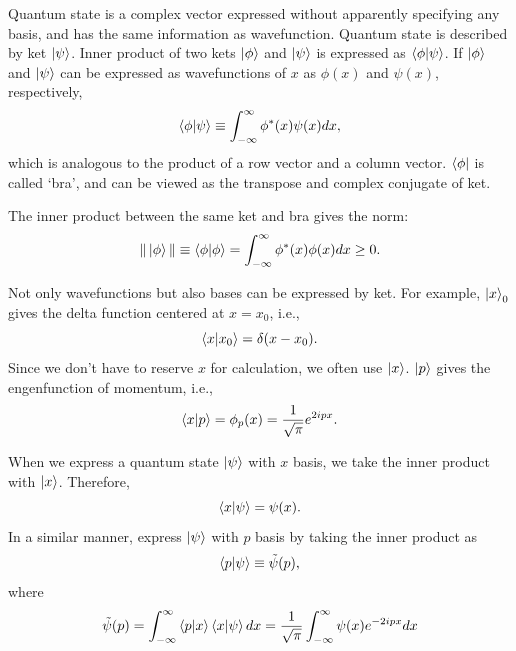 \documentclass{book}
\begin{document}
Quantum state is a complex vector expressed without apparently specifying any basis, and has the same information as wavefunction. Quantum state is described by ket $\ket \psi$. Inner product of two kets $\ket \phi$ and $\ket \psi$ is expressed as $\braket{\phi|\psi}$. If $\ket \phi$ and $\ket \psi$ can be expressed as wavefunctions of $x$ as $\phi(x)$ and $\psi(x)$, respectively, 
\begin{equation}
  \braket{\phi|\psi} \equiv \int_{-\infty}^{\infty}\phi^*(x)\psi(x)dx,
\end{equation}
which is analogous to the product of a row vector and a column vector. $\bra \phi$ is called `bra', and can be viewed as the transpose and complex conjugate of ket.

The inner product between the same ket and bra gives the norm:
\begin{equation}
  \|\ket \phi\| \equiv \braket{\phi|\phi} = \int_{-\infty}^{\infty}\phi^*(x)\phi(x)dx \geq 0.
\end{equation}



Not only wavefunctions but also bases can be expressed by ket. For example, $\ket x_0$ gives the delta function centered at $x = x_0$, i.e.,
\begin{equation}
  \braket{x|x_0} = \delta(x-x_0).
\end{equation}
Since we don't have to reserve $x$ for calculation, we often use $\ket x$. $\ket p$ gives the engenfunction of momentum, i.e.,
\begin{equation}
  \braket{x|p} = \phi_p(x) = \frac{1}{\sqrt{\pi}}e^{2ipx}.
\end{equation}

When we express a quantum state $\ket \psi$ with $x$ basis, we take the inner product with $\ket x$. Therefore,
\begin{equation}
  \braket{x|\psi} = \psi(x).
\end{equation}
In a similar manner, express $\ket \psi$ with $p$ basis by taking the inner product as
\begin{equation}
  \braket{p|\psi} \equiv \tilde \psi(p),
\end{equation}
where 
\begin{equation}
  \tilde\psi(p) = \int_{-\infty}^{\infty} \braket{p|x}\braket{x|\psi}dx = \frac{1}{\sqrt \pi}\int_{-\infty}^{\infty}\psi(x)e^{-2ipx}dx
\end{equation}
\end{document}
